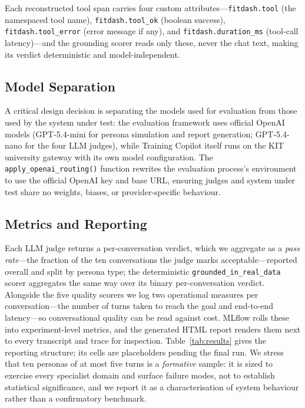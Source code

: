 

Each reconstructed tool span carries four custom attributes---\texttt{fitdash.tool} (the namespaced tool name), \texttt{fitdash.tool\_ok} (boolean success), \texttt{fitdash.tool\_error} (error message if any), and \texttt{fitdash.duration\_ms} (tool-call latency)---and the grounding scorer reads only these, never the chat text, making its verdict deterministic and model-independent.

\subsection{Model Separation}\label{sec:evaluation:models}

A critical design decision is separating the models used for evaluation from those used by the system under test: the evaluation framework uses official OpenAI models (GPT-5.4-mini for persona simulation and report generation; GPT-5.4-nano for the four LLM judges), while Training Copilot itself runs on the KIT university gateway with its own model configuration. The \texttt{apply\_openai\_routing()} function rewrites the evaluation process's environment to use the official OpenAI key and base URL, ensuring judges and system under test share no weights, biases, or provider-specific behaviour.

\subsection{Metrics and Reporting}\label{sec:evaluation:metrics}

Each LLM judge returns a per-conversation verdict, which we aggregate as a \textit{pass rate}---the fraction of the ten conversations the judge marks acceptable---reported overall and split by persona type; the deterministic \texttt{grounded\_in\_real\_data} scorer aggregates the same way over its binary per-conversation verdict. Alongside the five quality scorers we log two operational measures per conversation---the number of turns taken to reach the goal and end-to-end latency---so conversational quality can be read against cost. MLflow rolls these into experiment-level metrics, and the generated HTML report renders them next to every transcript and trace for inspection. Table~\ref{tab:results} gives the reporting structure; its cells are placeholders pending the final run. We stress that ten personas of at most five turns is a \textit{formative} sample: it is sized to exercise every specialist domain and surface failure modes, not to establish statistical significance, and we report it as a characterisation of system behaviour rather than a confirmatory benchmark.

